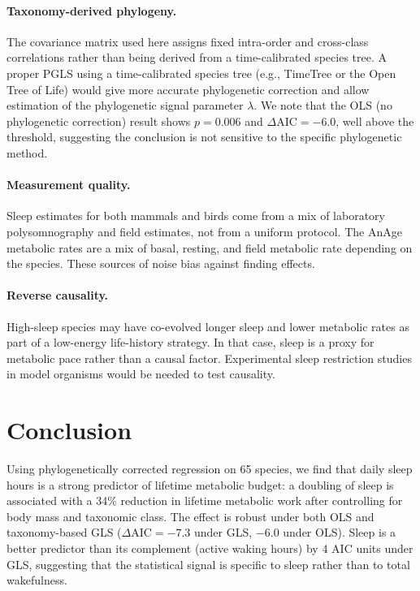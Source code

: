 \documentclass{article}
\begin{document}
\paragraph{Taxonomy-derived phylogeny.}
The covariance matrix used here assigns fixed intra-order and cross-class correlations
rather than being derived from a time-calibrated species tree. A proper PGLS using a
time-calibrated species tree (e.g., TimeTree or the Open Tree of Life) would give more
accurate phylogenetic correction and allow estimation of the phylogenetic signal
parameter $\lambda$. We note that the OLS
(no phylogenetic correction) result shows $p = 0.006$ and $\Delta\text{AIC} = -6.0$,
well above the threshold, suggesting the conclusion is not sensitive to the specific
phylogenetic method.

\paragraph{Measurement quality.}
Sleep estimates for both mammals and birds come from a mix of laboratory polysomnography
and field estimates, not from a uniform protocol. The AnAge metabolic rates are a mix of
basal, resting, and field metabolic rate depending on the species. These sources of noise
bias against finding effects.

\paragraph{Reverse causality.}
High-sleep species may have co-evolved longer sleep and lower metabolic rates as part of
a low-energy life-history strategy. In that case, sleep is a proxy for metabolic pace
rather than a causal factor. Experimental sleep restriction studies in model organisms
would be needed to test causality.


\section{Conclusion}
\label{sec:conclusion}

Using phylogenetically corrected regression on 65 species, we find that daily sleep
hours is a strong predictor of lifetime metabolic budget: a doubling of sleep is
associated with a 34\% reduction in lifetime metabolic work after controlling for body
mass and taxonomic class. The effect is robust under both OLS and taxonomy-based GLS
($\Delta\text{AIC} = -7.3$ under GLS, $-6.0$ under OLS). Sleep is a better predictor
than its complement (active waking hours) by 4 AIC units under GLS, suggesting that the
statistical signal is specific to sleep rather than to total wakefulness.
\end{document}
